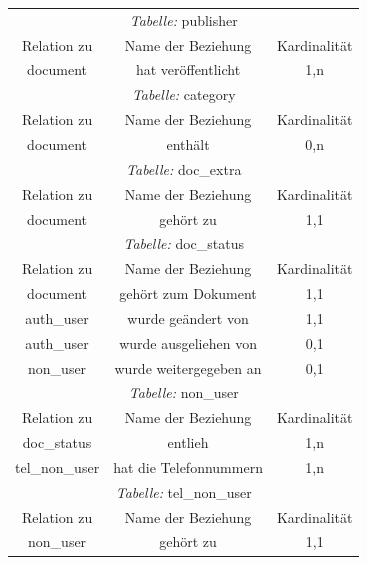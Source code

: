 \begin{longtable}{@{}ccc@{}}
  \toprule
  \multicolumn{3}{c}{\emph{Tabelle:} publisher} \\
  Relation zu & Name der Beziehung & Kardinalität \\
  \cmidrule(lr){1-1}\cmidrule(lr){2-2}\cmidrule(lr){3-3}
  document & hat veröffentlicht & 1,n \\

  \toprule
  \multicolumn{3}{c}{\emph{Tabelle:} category} \\
  Relation zu & Name der Beziehung & Kardinalität \\
  \cmidrule(lr){1-1}\cmidrule(lr){2-2}\cmidrule(lr){3-3}
  document & enthält & 0,n \\

  \toprule
  \multicolumn{3}{c}{\emph{Tabelle:} doc\_extra} \\
  Relation zu & Name der Beziehung & Kardinalität \\
  \cmidrule(lr){1-1}\cmidrule(lr){2-2}\cmidrule(lr){3-3}
  document & gehört zu & 1,1 \\

  \toprule
  \multicolumn{3}{c}{\emph{Tabelle:} doc\_status} \\
  Relation zu & Name der Beziehung & Kardinalität \\
  \cmidrule(lr){1-1}\cmidrule(lr){2-2}\cmidrule(lr){3-3}
  document & gehört zum Dokument & 1,1\\
  auth\_user & wurde geändert von & 1,1\\
  auth\_user & wurde ausgeliehen von & 0,1\\
  non\_user & wurde weitergegeben an & 0,1\\

  \toprule
  \multicolumn{3}{c}{\emph{Tabelle:} non\_user} \\
  Relation zu & Name der Beziehung & Kardinalität \\
  \cmidrule(lr){1-1}\cmidrule(lr){2-2}\cmidrule(lr){3-3}
  doc\_status & entlieh & 1,n\\
  tel\_non\_user & hat die Telefonnummern & 1,n\\

  \toprule
  \multicolumn{3}{c}{\emph{Tabelle:} tel\_non\_user} \\
  Relation zu & Name der Beziehung & Kardinalität \\
  \cmidrule(lr){1-1}\cmidrule(lr){2-2}\cmidrule(lr){3-3}
  non\_user & gehört zu & 1,1 \\


\end{longtable}
